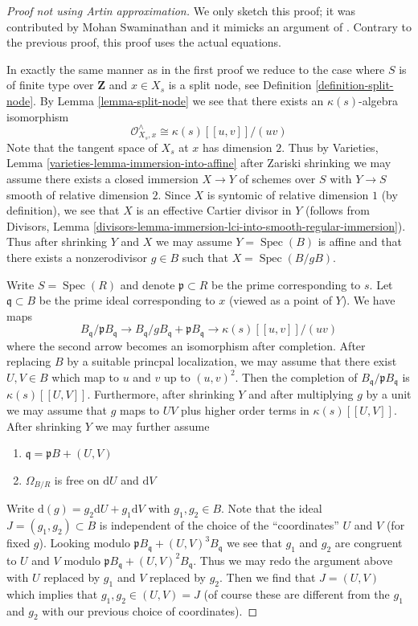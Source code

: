 \documentclass{stacks-project}
\theoremstyle{plain}
\theoremstyle{definition}
\theoremstyle{remark}
\numberwithin{equation}{subsection}
\def\Spec{\mathop{\mathrm{Spec}}}
\begin{document}
\begin{proof}[Proof not using Artin approximation]
We only sketch this proof; it was contributed by Mohan Swaminathan
and it mimicks an argument of \cite[Proposition X.2.1]{ACG}. Contrary
to the previous proof, this proof uses the actual equations.

\medskip\noindent
In exactly the same manner as in the first proof we reduce to the
case where $S$ is of finite type over $\mathbf{Z}$ and $x \in X_s$
is a split node, see Definition \ref{definition-split-node}.
By Lemma \ref{lemma-split-node} we see that there exists an
$\kappa(s)$-algebra isomorphism
$$
\mathcal{O}_{X_s, x}^\wedge \cong \kappa(s)[[u, v]]/(uv)
$$
Note that the tangent space of $X_s$ at $x$ has dimension $2$.
Thus by Varieties, Lemma \ref{varieties-lemma-immersion-into-affine}
after Zariski shrinking we may assume there exists a closed immersion
$X \to Y$ of schemes over $S$ with $Y \to S$ smooth of relative dimension $2$.
Since $X$ is syntomic of relative dimension $1$ (by definition), we see
that $X$ is an effective Cartier divisor in $Y$ (follows from
Divisors, Lemma
\ref{divisors-lemma-immersion-lci-into-smooth-regular-immersion}).
Thus after shrinking $Y$ and $X$ we may assume $Y = \Spec(B)$
is affine and that there exists a nonzerodivisor $g \in B$ such
that $X = \Spec(B/gB)$.

\medskip\noindent
Write $S = \Spec(R)$ and denote $\mathfrak p \subset R$ be the prime
corresponding to $s$. Let $\mathfrak q \subset B$ be the prime ideal
corresponding to $x$ (viewed as a point of $Y$). We have maps
$$
B_\mathfrak q / \mathfrak p B_\mathfrak q
\longrightarrow
B_\mathfrak q / g B_\mathfrak q + \mathfrak p B_\mathfrak q
\longrightarrow
\kappa(s)[[u, v]]/(uv)
$$
where the second arrow becomes an isomorphism after completion.
After replacing $B$ by a suitable princpal localization,
we may assume that there exist $U, V \in B$ which map to
$u$ and $v$ up to $(u, v)^2$. Then the completion of
$B_\mathfrak q/\mathfrak p B_\mathfrak q$
is $\kappa(s)[[U, V]]$. Furthermore, after
shrinking $Y$ and after multiplying $g$ by a unit we may
assume that $g$ maps to $UV$ plus higher order terms in
$\kappa(s)[[U, V]]$. After shrinking $Y$ we may further assume
\begin{enumerate}
\item $\mathfrak q = \mathfrak pB + (U, V)$
\item $\Omega_{B/R}$ is free on $\text{d}U$ and $\text{d}V$
\end{enumerate}
Write $\text{d}(g) = g_2 \text{d}U + g_1 \text{d}V$ with $g_1, g_2 \in B$.
Note that the ideal $J = (g_1, g_2) \subset B$ is independent of the
choice of the ``coordinates'' $U$ and $V$ (for fixed $g$).
Looking modulo $\mathfrak p B_\mathfrak q + (U, V)^3B_\mathfrak q$
we see that $g_1$ and $g_2$ are congruent to $U$ and $V$ modulo
$\mathfrak p B_\mathfrak q + (U, V)^2B_\mathfrak q$.
Thus we may redo the argument above with $U$ replaced by $g_1$
and $V$ replaced by $g_2$. Then we find that $J = (U, V)$
which implies that $g_1, g_2 \in (U, V) = J$ (of course these
are different from the $g_1$ and $g_2$ with our previous choice
of coordinates).


\end{proof}
\end{document}
